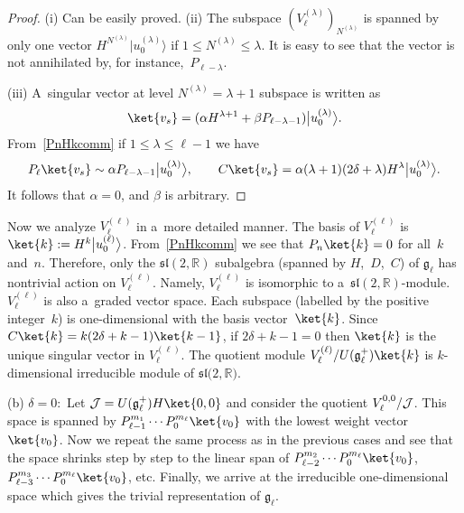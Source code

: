\documentclass[pdftex]{sigma}
\numberwithin{equation}{section}
\begin{document}
\begin{proof}
(i) Can be easily proved.
(ii) The subspace $ (V_{\ell}^{(\lambda)})_{N^{(\lambda)}} $ is spanned by only one vector $ H^{N^{(\lambda)}}
\big|u_0^{(\lambda)}\big\rangle  $ if $ 1 \leq N^{(\lambda)} \leq \lambda$.
It is easy to see that the vector is not annihilated by, for instan\-ce,~$P_{\ell-\lambda}$.

(iii) A~singular vector at level $ N^{(\lambda)} = \lambda + 1 $ subspace is written as
\begin{gather*}
\ket{v_s} = (\alpha H^{\lambda+1} + \beta P_{\ell-\lambda-1}) \big|u_0^{(\lambda)}\big\rangle .
\end{gather*}
From~\eqref{PnHkcomm} if $ 1 \leq \lambda \leq \ell-1 $ we have
\begin{gather*}
P_{\ell} \ket{v_s} \sim \alpha P_{\ell-\lambda-1} \big|u_0^{(\lambda)}\big\rangle ,
\qquad
C \ket{v_s} = \alpha (\lambda+1) (2\delta+\lambda) H^{\lambda} \big|u_0^{(\lambda)}\big\rangle .
\end{gather*}
It follows that $ \alpha = 0 $, and $ \beta $ is arbitrary.
\end{proof}

Now we analyze $ V_{\ell}^{(\ell)} $ in a~more detailed manner.
The basis of $ V_{\ell}^{(\ell)} $ is $ \ket{k}:= H^k \big|u_0^{(\ell)}\big\rangle $.
From~\eqref{PnHkcomm} we see that $ P_n \ket{k} = 0 $ for all~$k$ and~$n$.
Therefore, only the $ {\mathfrak{sl}}(2,{\mathbb R}) $ subalgebra (spanned by $ H$,~$D$,~$C$) of $ {\mathfrak g}_{\ell}
$ has nontrivial action on $ V_{\ell}^{(\ell)}$.
Namely, $ V_{\ell}^{(\ell)} $ is isomorphic to a~${\mathfrak{sl}}(2,{\mathbb R})$-module.
$ V_{\ell}^{(\ell)} $ is also a~graded vector space.
Each subspace (labelled by the positive integer~$k$) is one-dimensional with the basis vector~$\ket{k}$.
Since $ C \ket{k} = k(2\delta+k-1) \ket{k-1}$, if $ 2\delta+k-1 = 0 $ then $ \ket{k} $ is the unique singular vector in
$ V_{\ell}^{(\ell)}$.
The quotient module $ V_{\ell}^{(\ell)}/U({\mathfrak g}_{\ell}^+) \ket{k} $ is $ k$-dimensional irreducible module of $
{\mathfrak{sl}}(2,{\mathbb R)}$.

(b) $ \delta = 0: $ Let $ {\cal J} = U({\mathfrak g}_{\ell}^+) H \ket{0,0} $ and consider the quotient $
V^{0,0}_{\ell}/{\cal J}$.
This space is spanned by $ P_{\ell-1}^{m_1} \cdots P_0^{m_{\ell}} \ket{v_0} $ with the lowest weight vector $ \ket{v_0}$.
Now we repeat the same process as in the previous cases and see that the space shrinks step by step to the linear span
of $ P_{\ell-2}^{m_2} \cdots P_0^{m_{\ell}} \ket{v_0}$, $ P_{\ell-3}^{m_3} \cdots P_0^{m_{\ell}} \ket{v_0}$,  etc.
Finally, we arrive at the irreducible one-dimensional space which gives the trivial representation of $ {\mathfrak
g}_{\ell}$.
\end{document}
